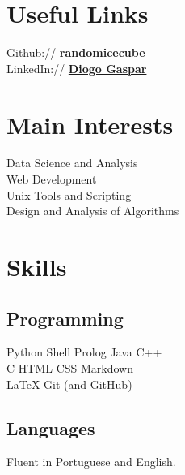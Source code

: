 \documentclass[]{deedy-resume-openfont}
\begin{document}
%
%
\lastupdated

%
%

%
%

\begin{minipage}[t]{0.33\textwidth}


\section{Useful Links} 
Github:// \href{https://github.com/randomicecube}{\bf randomicecube} \\
LinkedIn://  \href{https://www.linkedin.com/in/diogo-gaspar-74142821b/}{\bf Diogo Gaspar}


\section{Main Interests}
Data Science and Analysis \\
Web Development\\
Unix Tools and Scripting \\
Design and Analysis of Algorithms


\section{Skills}
\subsection{Programming}
Python \textbullet{} Shell \textbullet{} Prolog \textbullet{} Java \textbullet{} C++ \\
C \textbullet{} HTML \textbullet{} CSS \textbullet{} Markdown \\
\LaTeX \textbullet{} Git (and GitHub)
\sectionsep


\sectionsep

\subsection{Languages}
Fluent in Portuguese and English.
\sectionsep

%
%

\end{minipage} 
\end{document}

